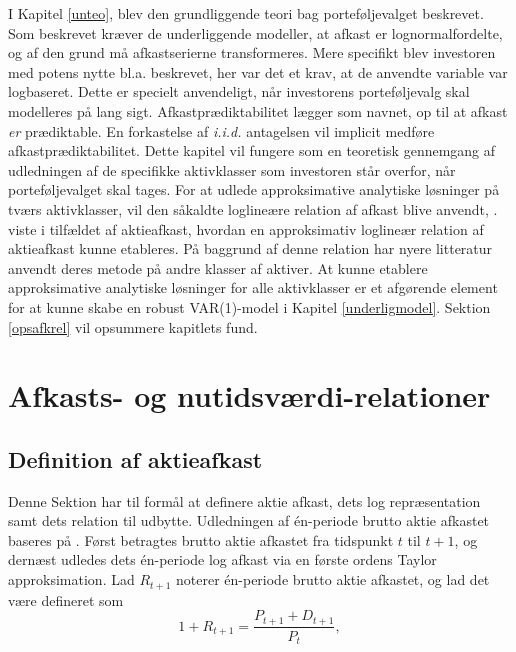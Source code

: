 \documentclass[
  a4paper,
  oneside]{memoir}
\begin{document}
I Kapitel \ref{unteo}, blev den grundliggende teori bag porteføljevalget beskrevet. Som beskrevet kræver de underliggende modeller, at afkast er lognormalfordelte, og af den grund må afkastserierne transformeres. Mere specifikt blev investoren med potens nytte bl.a. beskrevet, her var det et krav, at de anvendte variable var logbaseret. Dette er specielt anvendeligt, når investorens porteføljevalg skal modelleres på lang sigt. Afkastprædiktabilitet lægger som navnet, op til at afkast \emph{er} prædiktable. En forkastelse af \emph{i.i.d.} antagelsen vil implicit medføre afkastprædiktabilitet. Dette kapitel vil fungere som en teoretisk gennemgang af udledningen af de specifikke aktivklasser som investoren står overfor, når porteføljevalget skal tages. For at udlede approksimative analytiske løsninger på tværs aktivklasser, vil den såkaldte loglineære relation af afkast blive anvendt, \citep{Campbell1988}. \citep{Campbell1988} viste i tilfældet af aktieafkast, hvordan en approksimativ loglineær relation af aktieafkast kunne etableres. På baggrund af denne relation har nyere litteratur anvendt deres metode på andre klasser af aktiver. At kunne etablere approksimative analytiske løsninger for alle aktivklasser er et afgørende element for at kunne skabe en robust VAR(1)-model i Kapitel \ref{underligmodel}. Sektion \ref{opsafkrel} vil opsummere kapitlets fund.

\hypertarget{afkognut}{%
\section{Afkasts- og nutidsværdi-relationer}\label{afkognut}}

\hypertarget{defaktafk}{%
\subsection{Definition af aktieafkast}\label{defaktafk}}

Denne Sektion har til formål at definere aktie afkast, dets log repræsentation samt dets relation til udbytte. Udledningen af én-periode brutto aktie afkastet baseres på \citep{Campbell1988}. Først betragtes brutto aktie afkastet fra tidspunkt \(t\) til \(t+1\), og dernæst udledes dets én-periode log afkast via en første ordens Taylor approksimation. Lad \(R_{t+1}\) noterer én-periode brutto aktie afkastet, og lad det være defineret som
\begin{equation}
1+R_{t+1}=\frac{P_{t+1}+D_{t+1}}{P_t}, \label{eq:csaa}
\end{equation}
\end{document}
